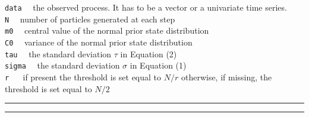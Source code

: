 \documentclass[
]{article}
\begin{document}
\texttt{data} ~~the observed process. It has to be a vector or a
univariate time series.\\
\texttt{N} ~~number of particles generated at each step\\
\texttt{m0} ~~central value of the normal prior state distribution\\
\texttt{C0} ~~variance of the normal prior state distribution\\
\texttt{tau} ~~the standard deviation \(\tau\) in Equation (2)\\
\texttt{sigma} ~~the standard deviation \(\sigma\) in Equation (1)\\
\texttt{r} ~~ if present the threshold is set equal to \(N/r\)
otherwise, if missing, the threshold is set equal to \(N/2\)

\hrule
\hrule
\end{document}
